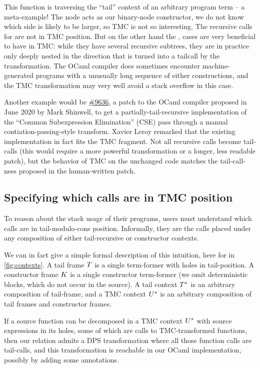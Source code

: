 This function is traversing the ``tail'' context of an arbitrary
program term -- a meta-example! The  node acts as
our binary-node constructor, we do not know which side is likely to be
larger, so TMC is not so interesting. The recursive calls for
 are not in TMC position. But on the other hand the
,  cases are very beneficial to have in
TMC: while they have several recursive subtrees, they are in practice
only deeply nested in the direction that is turned into a tailcall by
the transformation. The OCaml compiler does sometimes encounter
machine-generated programs with a unusually long sequence of either
constructions, and the TMC transformation may very well avoid a stack
overflow in this case.

Another example would be
\href{https://github.com/ocaml/ocaml/pull/9636}{\#9636}, a patch to
the OCaml compiler proposed in June 2020 by Mark Shinwell, to get
a partially-tail-recursive implementation of the ``Common
Subexpression Elimination'' (CSE) pass through a manual
contiation-passing-style transform. Xavier Leroy remarked that the
existing implementation in fact fits the TMC fragment. Not all
recursive calls become tail-calls (this would require a more powerful
transformation or a longer, less readable patch), but the behavior of
TMC on the unchanged code matches the tail-call-ness proposed in the
human-written patch.

\subsection{Specifying which calls are in TMC position} \label{subsec:specification}
To reason about the stack usage of their programs, users must understand which calls are in tail-modulo-cons position.
Informally, they are the calls placed under any composition of either tail-recursive or constructor contexts.

We can in fact give a simple formal description of this intuition, here for \DataLang in \cref{fig:contexts}.
A tail frame $\datalangTailFrame$ is a single term-former with holes in tail-position.
A constructor frame $\datalangConsFrame$ is a single constructor term-former (we omit deterministic blocks, which do not occur in the source).
A tail context $\datalangTailCtx$ is an arbitrary composition of tail-frame, and a TMC context $\datalangTMCCtx$ is an arbitrary composition of tail frames and constructor frames.

If a source function can be decomposed in a TMC context $\datalangTMCCtx$ with source expressions in its holes, some of which are calls to TMC-transformed functions, then our relation admits a DPS transformation where all those function calls are tail-calls, and this transformation is reachable in our OCaml implementation, possibly by adding some annotations.

